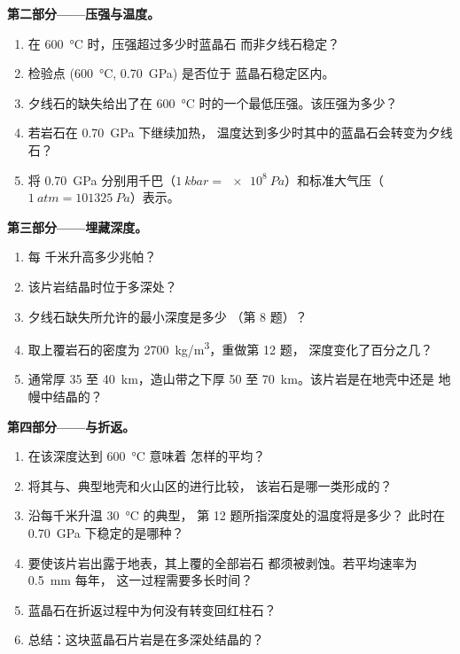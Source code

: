 \begin{problem}
\medskip
\noindent\textbf{第二部分——压强与温度。}
\begin{enumerate}[resume]
  \item 在 \qty{600}{\celsius} 时，压强超过多少时蓝晶石
        而非夕线石稳定？
  \item 检验点 (\qty{600}{\celsius}, \qty{0.70}{GPa}) 是否位于
        蓝晶石稳定区内。
  \item 夕线石的缺失给出了在
        \qty{600}{\celsius} 时的一个最低压强。该压强为多少？
  \item 若岩石在 \qty{0.70}{GPa} 下继续加热，
        温度达到多少时其中的蓝晶石会转变为夕线石？
  \item 将 \qty{0.70}{GPa} 分别用千巴（$\qty{1}{kbar} =
        \qty{e8}{Pa}$）和标准大气压（$\qty{1}{atm} = \qty{101325}{Pa}$）表示。
\end{enumerate}

\medskip
\noindent\textbf{第三部分——埋藏深度。}
\begin{enumerate}[resume]
  \item {}每
        千米升高多少兆帕？
  \item 该片岩结晶时位于多深处？
  \item 夕线石缺失所允许的最小深度是多少
        （第 8 题）？
  \item 取上覆岩石的密度为 \qty{2700}{kg/m^3}，重做第 12 题，
        深度变化了百分之几？
  \item {}通常厚 35 至 \qty{40}{km}，造山带之下厚 50 至
        \qty{70}{km}。该片岩是在地壳中还是
        地幔中结晶的？
\end{enumerate}

\medskip
\noindent\textbf{第四部分——与折返。}
\begin{enumerate}[resume]
  \item 在该深度达到 \qty{600}{\celsius} 意味着
        怎样的平均？
  \item 将其与、典型地壳和火山区的进行比较，
        该岩石是哪一类形成的？
  \item 沿每千米升温 \qty{30}{\celsius} 的典型，
        第 12 题所指深度处的温度将是多少？
        此时在 \qty{0.70}{GPa} 下稳定的是哪种？
  \item 要使该片岩出露于地表，其上覆的全部岩石
        都须被剥蚀。若平均速率为 \qty{0.5}{mm} 每年，
        这一过程需要多长时间？
  \item 蓝晶石在折返过程中为何没有转变回红柱石？
  \item 总结：这块蓝晶石片岩是在多深处结晶的？
\end{enumerate}
\end{problem}

